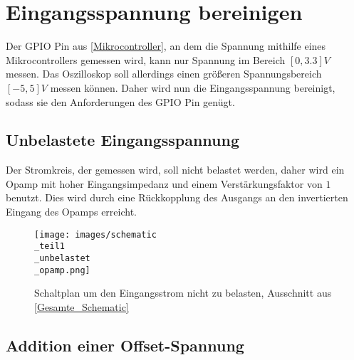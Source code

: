 \section{Eingangsspannung bereinigen}
\label{Eingangsspannung bereinigen}

Der GPIO Pin aus \ref{Mikrocontroller}, an dem die Spannung mithilfe eines Mikrocontrollers gemessen wird,
kann nur Spannung im Bereich $[0, 3.3]V$ messen.
Das Oszilloskop soll allerdings einen größeren Spannungsbereich $[-5, 5]V$ messen können.
Daher wird nun die Eingangsspannung bereinigt, sodass sie den Anforderungen des GPIO Pin genügt.

\subsection{Unbelastete Eingangsspannung}
\label{Unbelastete Eingangsspannung}
Der Stromkreis, der gemessen wird, soll nicht belastet werden, daher wird ein Opamp mit
hoher Eingangsimpedanz und einem Verstärkungsfaktor von $1$ benutzt.
Dies wird durch eine Rückkopplung des Ausgangs an den invertierten Eingang des Opamps erreicht.
\begin{figure}[h]
	\centering
	\texttt{[image: images/schematic\\\_teil1\\\_unbelastet\\\_opamp.png]}
	\caption{Schaltplan um den Eingangsstrom nicht zu belasten, Ausschnitt aus \ref{Gesamte_Schematic}}
\end{figure}


\subsection{Addition einer Offset-Spannung}
\label{Addition einer Offset-Spannung}

